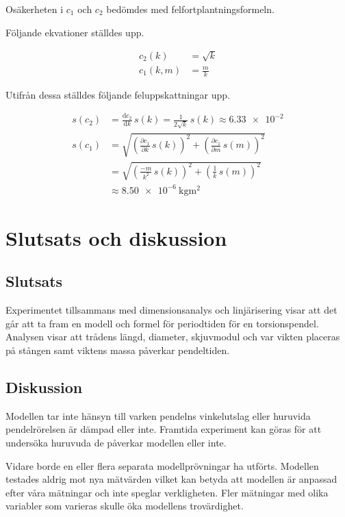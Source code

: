 \documentclass[a4paper,12pt]{article}
\newcommand*{\dd}{\mathrm{d}}
\begin{document}
Osäkerheten i $c_1$ och $c_2$ bedömdes med felfortplantningsformeln.

Följande ekvationer ställdes upp.

\begin{align}
  c_2(k) &= \sqrt{k} \\
  c_1(k, m) &= \frac{m}{k}
\end{align} 

Utifrån dessa ställdes följande feluppskattningar upp.

\begin{align}
  s(c_2) &= \frac{\dd c_2}{\dd k} \, s(k) = \frac{1}{2\sqrt{k}} \, s(k) \approx \num{6.33e-2} \\
  s(c_1) &= \sqrt{\left( \frac{\partial c_1}{\partial k} \, s(k) \right)^2 + \left( \frac{\partial c_1}{\partial m} \, s(m) \right)^2} \nonumber \\
         &= \sqrt{\left( \frac{-m}{k^2} \, s(k) \right)^2 + \left( \frac{1}{k} \, s(m) \right)^2} \nonumber \\
  &\approx \SI{8.50e-6}{\kilogram \meter \squared}
\end{align}

\clearpage

\section{Slutsats och diskussion}

\subsection*{Slutsats}

Experimentet tillsammans med dimensionsanalys och linjärisering visar att det
går att ta fram en modell och formel för periodtiden för en torsionspendel.
Analysen visar att trådens längd, diameter, skjuvmodul och var vikten placeras
på stången samt viktens massa påverkar pendeltiden. 

\subsection*{Diskussion}

Modellen tar inte hänsyn till varken pendelns vinkelutslag eller huruvida
pendelrörelsen är dämpad eller inte. Framtida experiment kan göras för att
undersöka huruvuda de påverkar modellen eller inte.

Vidare borde en eller flera separata modellprövningar ha utförts. Modellen
testades aldrig mot nya mätvärden vilket kan betyda att modellen är anpassad
efter våra mätningar och inte speglar verkligheten. Fler mätningar med olika
variabler som varieras skulle öka modellens trovärdighet.
\end{document}

